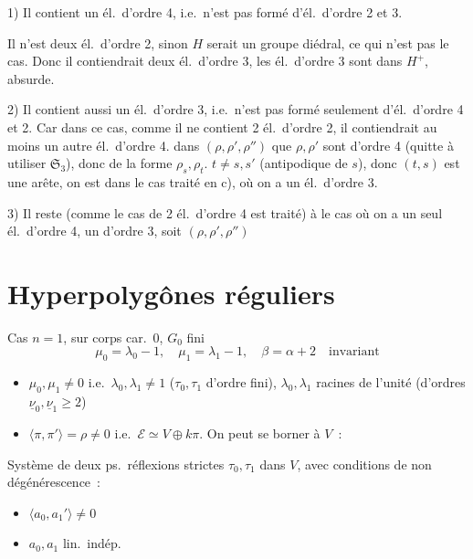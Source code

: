 \documentclass[11pt,a4paper]{article}
\begin{document}
1) Il contient un él.\ d'ordre 4, i.e.\ n'est pas formé d'él.\ d'ordre 2 et
3.

Il n'est   deux él.\ d'ordre 2,
sinon $H$ serait un groupe diédral, ce qui n'est pas le cas. Donc il
contiendrait deux él.\ d'ordre 3, 
\struck{\ill{}} les él.\ d'ordre 3 sont dans $H^{+}$, absurde.

2) Il contient aussi un él.\ d'ordre 3, i.e.\ n'est pas formé seulement
d'él.\ d'ordre 4 et 2. Car dans ce cas, comme il ne contient 
2 él.\ d'ordre 2, il contiendrait au moins un autre él.\ d'ordre 4.
  dans $(\rho, \rho', \rho'')$
que $\rho, \rho'$ sont d'ordre 4 (quitte à utiliser
$\mathfrak{S}_3$), donc de la forme $\rho_s, \rho_t$. 
 $t \neq s, s'$ (antipodique de $s$), donc $(t, s)$ est une
arête, on est dans le cas traité en c), où on a un él.\ d'ordre 3.

3) Il reste (comme le cas de 2 él.\ d'ordre 4 est traité) à 
le cas où on a un seul él.\ d'ordre 4, un
d'ordre 3, soit $(\rho, \rho', \rho'')$ 


\section{Hyperpolygônes réguliers}


Cas $n = 1$, sur corps 
car.\ 0, $G_0$ fini
\[
\mu_0 = \lambda_0 - 1,\quad \mu_1 = \lambda_1 - 1,\quad \beta = \alpha + 2
\quad \text{invariant}
\]
\begin{itemize}
\item[1)] $\mu_0, \mu_1 \neq 0$ i.e.\ $\lambda_0, \lambda_1 \neq 1$
($\tau_0, \tau_1$ d'ordre fini),
$\lambda_0, \lambda_1$ racines de l'unité (d'ordres
$\underline{\nu}_0, \underline{\nu}_1 \geq 2$)
\item[2)] $\langle \pi, \pi' \rangle = \rho \neq 0$
 i.e.\ $\mathcal{E} \simeq V \oplus k\pi$.
On peut se borner à $V$~:
\end{itemize}
Système de deux ps.\ réflexions strictes $\tau_0, \tau_1$ dans $V$, avec
conditions de non dégénérescence~:
\begin{itemize}
\item[a)] $\langle a_0, a_1' \rangle \neq 0$
\item[b)] $a_0, a_1$ lin.\ indép.
\end{itemize}
\end{document}
